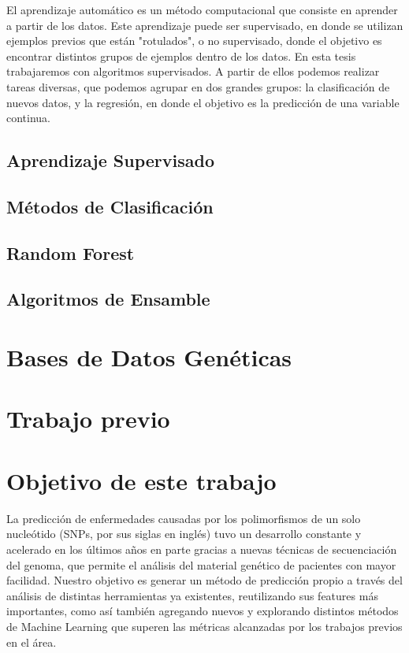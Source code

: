 El aprendizaje automático es un método computacional que consiste en aprender a partir de los datos. Este aprendizaje puede ser supervisado, en donde se utilizan ejemplos previos que están "rotulados", o no supervisado, donde el objetivo es encontrar distintos grupos de ejemplos dentro de los datos. En esta tesis trabajaremos con algoritmos supervisados. A partir de ellos podemos realizar tareas diversas, que podemos agrupar en dos grandes grupos: la clasificación de nuevos datos, y la regresión, en donde el objetivo es la predicción de una variable continua. 

\subsection{Aprendizaje Supervisado}

\subsection{Métodos de Clasificación}

\subsection{Random Forest}

\subsection{Algoritmos de Ensamble}

\section{Bases de Datos Genéticas}

\section{Trabajo previo}

\section{Objetivo de este trabajo}

La predicción de enfermedades causadas por los polimorfismos de un solo nucleótido (SNPs, por sus siglas en inglés) tuvo un desarrollo constante y acelerado en los últimos años en parte gracias a nuevas técnicas de secuenciación del genoma, que permite el análisis del material genético de pacientes con mayor facilidad. Nuestro objetivo es generar un método de predicción propio a través del análisis de distintas herramientas ya existentes, reutilizando sus features más importantes, como así también agregando nuevos y explorando distintos métodos de Machine Learning que superen las métricas alcanzadas por los trabajos previos en el área.



